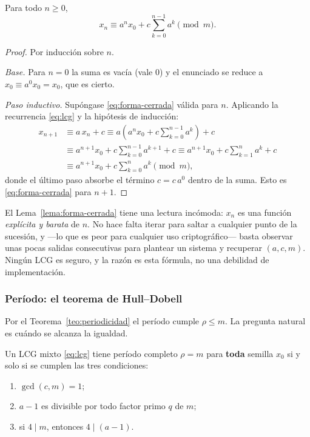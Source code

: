 \begin{lema}
\label{lema:forma-cerrada}
Para todo $n \ge 0$,
\begin{equation}
  x_n \equiv a^n x_0 + c \sum_{k=0}^{n-1} a^k \pmod{m}.
  \label{eq:forma-cerrada}
\end{equation}
\end{lema}

\begin{proof}
Por inducción sobre $n$.

\emph{Base.} Para $n = 0$ la suma es vacía (vale $0$) y el enunciado se reduce a
$x_0 \equiv a^0 x_0 = x_0$, que es cierto.

\emph{Paso inductivo.} Supóngase \eqref{eq:forma-cerrada} válida para $n$.
Aplicando la recurrencia \eqref{eq:lcg} y la hipótesis de inducción:
\begin{align*}
  x_{n+1} &\equiv a\,x_n + c
   \equiv a\left(a^n x_0 + c \sum_{k=0}^{n-1} a^k\right) + c \\
  &\equiv a^{n+1} x_0 + c \sum_{k=0}^{n-1} a^{k+1} + c
   \equiv a^{n+1} x_0 + c \sum_{k=1}^{n} a^{k} + c \\
  &\equiv a^{n+1} x_0 + c \sum_{k=0}^{n} a^{k} \pmod{m},
\end{align*}
donde el último paso absorbe el término $c = c\,a^0$ dentro de la suma. Esto es
\eqref{eq:forma-cerrada} para $n+1$.
\end{proof}

El Lema~\ref{lema:forma-cerrada} tiene una lectura incómoda: $x_n$ es una
función \emph{explícita y barata} de $n$. No hace falta iterar para saltar a
cualquier punto de la sucesión, y —lo que es peor para cualquier uso
criptográfico— basta observar unas pocas salidas consecutivas para plantear un
sistema y recuperar $(a, c, m)$. Ningún LCG es seguro, y la razón es esta
fórmula, no una debilidad de implementación.

\subsubsection{Período: el teorema de Hull--Dobell}

Por el Teorema~\ref{teo:periodicidad} el período cumple $\rho \le m$. La
pregunta natural es cuándo se alcanza la igualdad.

\begin{teorema}
\label{teo:hull-dobell}
Un LCG mixto \eqref{eq:lcg} tiene período completo $\rho = m$ para
\textbf{toda} semilla $x_0$ si y solo si se cumplen las tres condiciones:
\begin{enumerate}
  \item $\gcd(c, m) = 1$;
  \item $a - 1$ es divisible por todo factor primo $q$ de $m$;
  \item si $4 \mid m$, entonces $4 \mid (a-1)$.
\end{enumerate}
\end{teorema}

